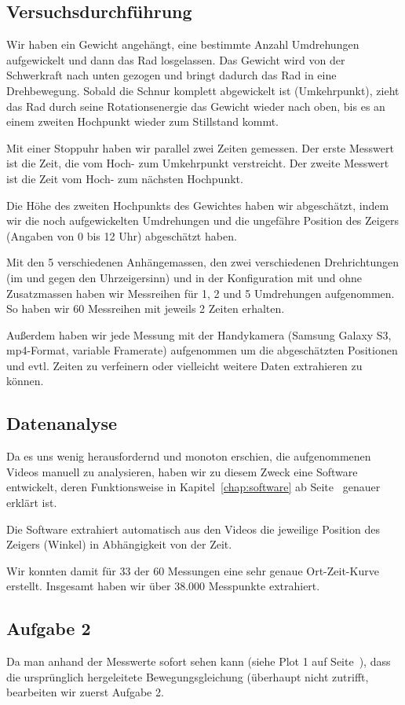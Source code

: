 \documentclass[a4paper,german,12pt,smallheadings]{scrartcl}
\begin{document}
\subsection{Versuchsdurchführung}

Wir haben ein Gewicht angehängt, eine bestimmte Anzahl Umdrehungen aufgewickelt
und dann das Rad losgelassen. Das Gewicht wird von der Schwerkraft nach unten
gezogen und bringt dadurch das Rad in eine Drehbewegung. Sobald die Schnur
komplett abgewickelt ist (Umkehrpunkt), zieht das Rad durch seine
Rotationsenergie das Gewicht wieder nach oben, bis es an einem zweiten
Hochpunkt wieder zum Stillstand kommt.

Mit einer Stoppuhr haben wir parallel zwei Zeiten gemessen. Der erste Messwert
ist die Zeit, die vom Hoch- zum Umkehrpunkt verstreicht. Der zweite Messwert ist
die Zeit vom Hoch- zum nächsten Hochpunkt.

Die Höhe des zweiten Hochpunkts des Gewichtes haben wir abgeschätzt, indem wir
die noch aufgewickelten Umdrehungen und die ungefähre Position des Zeigers
(Angaben von 0 bis 12 Uhr) abgeschätzt haben.

Mit den 5 verschiedenen Anhängemassen, den zwei verschiedenen Drehrichtungen
(im und gegen den Uhrzeigersinn) und in der Konfiguration mit und ohne
Zusatzmassen haben wir Messreihen für 1, 2 und 5 Umdrehungen aufgenommen. So
haben wir 60 Messreihen mit jeweils 2 Zeiten erhalten.

Außerdem haben wir jede Messung mit der Handykamera (Samsung Galaxy S3,
mp4-Format, variable Framerate) aufgenommen um die abgeschätzten Positionen und
evtl. Zeiten zu verfeinern oder vielleicht weitere Daten extrahieren zu können.

\subsection{Datenanalyse}
Da es uns wenig herausfordernd und monoton erschien, die aufgenommenen Videos
manuell zu analysieren, haben wir zu diesem Zweck eine Software entwickelt,
deren Funktionsweise in Kapitel~\ref{chap:software} ab
Seite~\pageref{chap:software} genauer erklärt ist.

Die Software extrahiert automatisch aus den Videos die jeweilige Position des
Zeigers (Winkel) in Abhängigkeit von der Zeit.

Wir konnten damit für 33 der 60 Messungen eine sehr genaue Ort-Zeit-Kurve
erstellt. Insgesamt haben wir über 38.000 Messpunkte extrahiert.

\subsection{Aufgabe 2}
Da man anhand der Messwerte sofort sehen kann (siehe Plot 1 auf
Seite~\pageref{plot:57-lin}), dass die ursprünglich hergeleitete
Bewegungsgleichung (überhaupt nicht zutrifft, bearbeiten wir zuerst Aufgabe 2.
\end{document}
